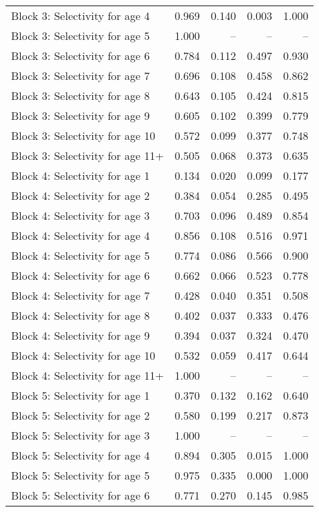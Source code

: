 \documentclass[
]{article}
\begin{document}
\begin{landscape}
\begin{longtable}[t]{lrrrr}
\addlinespace
Block 3: Selectivity for age 4 & 0.969 & 0.140 & 0.003 & 1.000\\
Block 3: Selectivity for age 5 & 1.000 & -- & -- & --\\
Block 3: Selectivity for age 6 & 0.784 & 0.112 & 0.497 & 0.930\\
Block 3: Selectivity for age 7 & 0.696 & 0.108 & 0.458 & 0.862\\
Block 3: Selectivity for age 8 & 0.643 & 0.105 & 0.424 & 0.815\\
\addlinespace
Block 3: Selectivity for age 9 & 0.605 & 0.102 & 0.399 & 0.779\\
Block 3: Selectivity for age 10 & 0.572 & 0.099 & 0.377 & 0.748\\
Block 3: Selectivity for age 11+ & 0.505 & 0.068 & 0.373 & 0.635\\
Block 4: Selectivity for age 1 & 0.134 & 0.020 & 0.099 & 0.177\\
Block 4: Selectivity for age 2 & 0.384 & 0.054 & 0.285 & 0.495\\
\addlinespace
Block 4: Selectivity for age 3 & 0.703 & 0.096 & 0.489 & 0.854\\
Block 4: Selectivity for age 4 & 0.856 & 0.108 & 0.516 & 0.971\\
Block 4: Selectivity for age 5 & 0.774 & 0.086 & 0.566 & 0.900\\
Block 4: Selectivity for age 6 & 0.662 & 0.066 & 0.523 & 0.778\\
Block 4: Selectivity for age 7 & 0.428 & 0.040 & 0.351 & 0.508\\
\addlinespace
Block 4: Selectivity for age 8 & 0.402 & 0.037 & 0.333 & 0.476\\
Block 4: Selectivity for age 9 & 0.394 & 0.037 & 0.324 & 0.470\\
Block 4: Selectivity for age 10 & 0.532 & 0.059 & 0.417 & 0.644\\
Block 4: Selectivity for age 11+ & 1.000 & -- & -- & --\\
Block 5: Selectivity for age 1 & 0.370 & 0.132 & 0.162 & 0.640\\
\addlinespace
Block 5: Selectivity for age 2 & 0.580 & 0.199 & 0.217 & 0.873\\
Block 5: Selectivity for age 3 & 1.000 & -- & -- & --\\
Block 5: Selectivity for age 4 & 0.894 & 0.305 & 0.015 & 1.000\\
Block 5: Selectivity for age 5 & 0.975 & 0.335 & 0.000 & 1.000\\
Block 5: Selectivity for age 6 & 0.771 & 0.270 & 0.145 & 0.985\\

\end{longtable}
\end{landscape}
\end{document}
